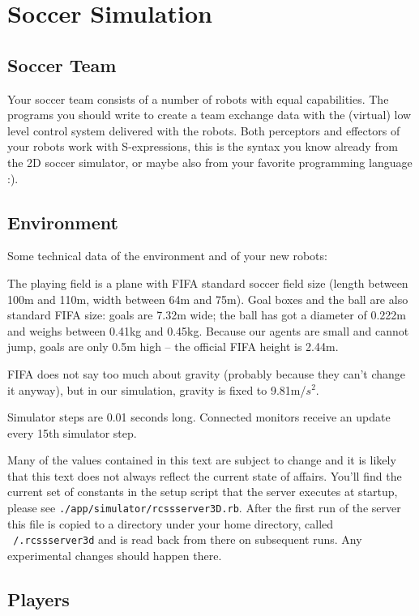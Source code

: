 \section{Soccer Simulation}

\subsection{Soccer Team}

Your soccer team consists of a number of robots with equal
capabilities. The programs you should write to create a team exchange
data with the (virtual) low level control system delivered with the
robots. Both perceptors and effectors of your robots work with
S-expressions, this is the syntax you know already from the 2D soccer
simulator, or maybe also from your favorite programming language :).

\subsection{Environment}

Some technical data of the environment and of your new robots:

The playing field is a plane with FIFA standard soccer field size
(length between 100m and 110m, width between 64m and 75m).  Goal boxes
and the ball are also standard FIFA size: goals are 7.32m wide; the
ball has got a diameter of 0.222m and weighs between 0.41kg and
0.45kg.  Because our agents are small and cannot jump, goals are only
0.5m high -- the official FIFA height is 2.44m.

FIFA does not say too much about gravity (probably because they can't
change it anyway), but in our simulation, gravity is fixed to
9.81m/$s^2$.

Simulator steps are 0.01 seconds long. Connected monitors receive an
update every 15th simulator step.

Many of the values contained in this text are subject to change and it
is likely that this text does not always reflect the current state of
affairs. You'll find the current set of constants in the setup script
that the server executes at startup, please see
\texttt{./app/simulator/rcssserver3D.rb}. After the first run of the
server this file is copied to a directory under your home directory,
called \texttt{~/.rcssserver3d} and is read back from there on
subsequent runs. Any experimental changes should happen there.

\subsection{Players}

